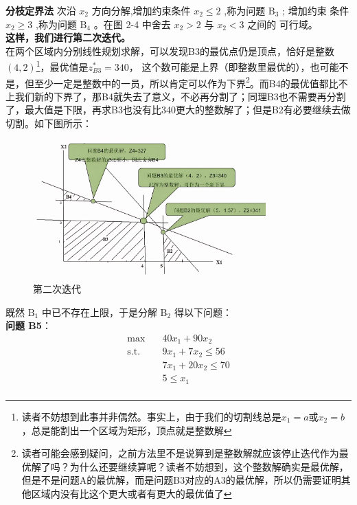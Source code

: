 \begin{exbox}{\textbf{分枝定界法}}
        次沿 \( {x}_{2} \) 方向分解,增加约束条件 \( {x}_{2} \leq  2 \) ,称为问题 \( \text{B}_{3} \) ; 增加约束
        条件 \( {x}_{2} \geq  3 \) ,称为问题 \( \text{B}_{4} \) 。在图 2-4 中舍去 \( {x}_{2} > 2 \) 与 \( {x}_{2} < 3 \) 之间的
        可行域。\\
        \textbf{这样，我们进行第二次迭代。}\\
        在两个区域内分别线性规划求解，可以发现B3的最优点仍是顶点，恰好是整数$(4,2)$\footnote{读者不妨想到此事并非偶然。事实上，由于我们的切割线总是$x_1=a$或$x_2=b$，总是能割出一个区域为矩形，顶点就是整数解}，最优值是$z_{B3}^* = 340$，
        这个数可能是上界（即整数里最优的），也可能不是，但至少一定是整数中的一员，所以肯定可以作为下界\footnote{读者可能会感到疑问，之前方法里不是说算到是整数解就应该停止迭代作为最优解了吗？为什么还要继续算呢？读者不妨想到，这个整数解确实是最优解，但是不是问题A的最优解，而是问题B3对应的A3的最优解，所以仍需要证明其他区域内没有比这个更大或者有更大的最优值了}。而B4的最优值都比不上我们新的下界了，那B4就失去了意义，不必再分割了；同理B3也不需要再分割了，最大值是下限，再求B3也没有比340更大的整数解了；但是B2有必要继续去做切割。如下图所示：
        \begin{figure}[H]
            \centering
            \includegraphics[width=0.8\textwidth]{./image/13.png}
            \caption{第二次迭代}
            \label{fig:Chapter4_Temporary_Pavilion_4}
        \end{figure}
        既然 $\text{B}_1$ 中已不存在上限，于是分解 $\text{B}_2$ 得以下问题：\\
        \textbf{问题 B5}：
        \begin{align*}
        \max \quad & 40x_1 + 90x_2 \\
        \text{s.t.} \quad & 9x_1 + 7x_2 \leq 56 \\
        & 7x_1 + 20x_2 \leq 70 \\
        & 5 \leq x_1 \\

\end{align*}
\end{exbox}
